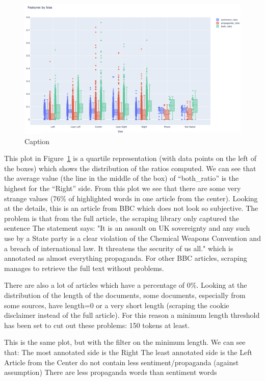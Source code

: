 \begin{figure}[!htbp]
    \centering
    \includegraphics[width=\linewidth]{figures/4.3_prop_sent_across_leaning.png}
    \caption{Caption}
    \label{fig:prop_sent_across_leaning}
\end{figure}

This plot in Figure~\ref{fig:prop_sent_across_leaning} is a quartile representation (with data points on the left of the boxes) which shows the distribution of the ratios computed. We can see that the average value (the line in the middle of the box) of “both\_ratio” is the highest for the “Right” side.
From this plot we see that there are some very strange values (76\% of highlighted words in one article from the center). Looking at the details, this is an article from BBC which does not look so subjective. The problem is that from the full article, the scraping library only captured the sentence The statement says: "It is an assault on UK sovereignty and any such use by a State party is a clear violation of the Chemical Weapons Convention and a breach of international law. It threatens the security of us all." which is annotated as almost everything propaganda. For other BBC articles, scraping manages to retrieve the full text without problems.

There are also a lot of articles which have a percentage of 0\%. Looking at the distribution of the length of the documents, some documents, especially from some sources, have length=0 or a very short length (scraping the cookie disclaimer instead of the full article).
For this reason a minimum length threshold has been set to cut out these problems: 150 tokens at least.

This is the same plot, but with the filter on the minimum length.
We can see that:
The most annotated side is the Right
The least annotated side is the Left
Article from the Center do not contain less sentiment/propaganda (against assumption)
There are less propaganda words than sentiment words



